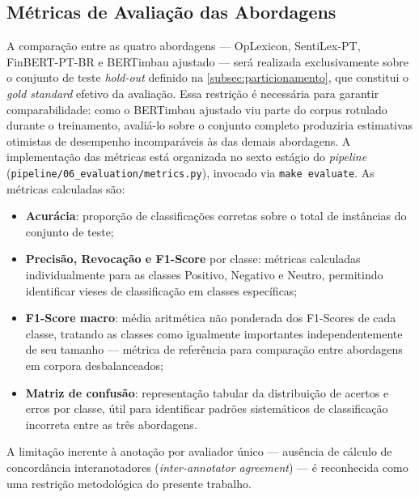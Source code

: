 \subsection{Métricas de Avaliação das Abordagens}
\label{subsec:metricas_avaliacao}

A comparação entre as quatro abordagens --- OpLexicon, SentiLex-PT, FinBERT-PT-BR e BERTimbau ajustado --- será realizada exclusivamente sobre o conjunto de teste \textit{hold-out} definido na \autoref{subsec:particionamento}, que constitui o \textit{gold standard} efetivo da avaliação. Essa restrição é necessária para garantir comparabilidade: como o BERTimbau ajustado viu parte do corpus rotulado durante o treinamento, avaliá-lo sobre o conjunto completo produziria estimativas otimistas de desempenho incomparáveis às das demais abordagens. A implementação das métricas está organizada no sexto estágio do \textit{pipeline} (\texttt{pipeline/06\_evaluation/metrics.py}), invocado via \texttt{make evaluate}. As métricas calculadas são:

\begin{itemize}
	\item \textbf{Acurácia}: proporção de classificações corretas sobre o total de instâncias do conjunto de teste;
	
	\item \textbf{Precisão, Revocação e F1-Score} por classe: métricas calculadas individualmente para as classes Positivo, Negativo e Neutro, permitindo identificar vieses de classificação em classes específicas;
	
	\item \textbf{F1-Score macro}: média aritmética não ponderada dos F1-Scores de cada classe, tratando as classes como igualmente importantes independentemente de seu tamanho --- métrica de referência para comparação entre abordagens em corpora desbalanceados;
	
	\item \textbf{Matriz de confusão}: representação tabular da distribuição de acertos e erros por classe, útil para identificar padrões sistemáticos de classificação incorreta entre as três abordagens.
\end{itemize}

A limitação inerente à anotação por avaliador único --- ausência de cálculo de concordância interanotadores (\textit{inter-annotator agreement}) --- é reconhecida como uma restrição metodológica do presente trabalho.